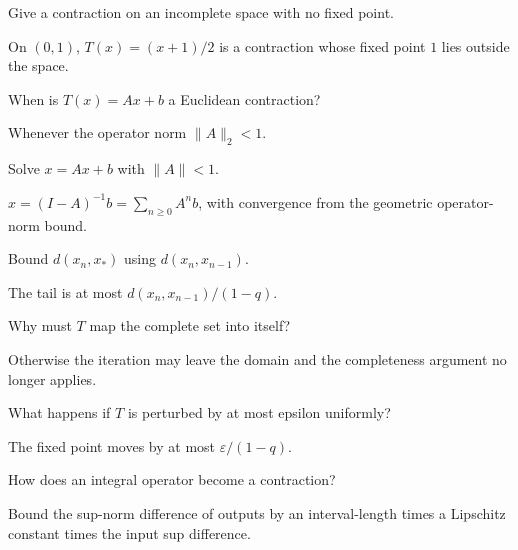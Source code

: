 \begin{problem}\label{prob:ii16-problem-04}
Give a contraction on an incomplete space with no fixed point.
\end{problem}
\begin{solution}
On $(0,1)$, $T(x)=(x+1)/2$ is a contraction whose fixed point $1$ lies outside the space.
\end{solution}

\begin{problem}\label{prob:ii16-problem-05}
When is $T(x)=Ax+b$ a Euclidean contraction?
\end{problem}
\begin{solution}
Whenever the operator norm $\|A\|_2<1$.
\end{solution}

\begin{problem}\label{prob:ii16-problem-06}
Solve $x=Ax+b$ with $\|A\|<1$.
\end{problem}
\begin{solution}
$x=(I-A)^{-1}b=\sum_{n\ge0}A^n b$, with convergence from the geometric operator-norm bound.
\end{solution}

\begin{problem}\label{prob:ii16-problem-07}
Bound $d(x_n,x_*)$ using $d(x_n,x_{n-1})$.
\end{problem}
\begin{solution}
The tail is at most $d(x_n,x_{n-1})/(1-q)$.
\end{solution}

\begin{problem}\label{prob:ii16-problem-08}
Why must $T$ map the complete set into itself?
\end{problem}
\begin{solution}
Otherwise the iteration may leave the domain and the completeness argument no longer applies.
\end{solution}

\begin{problem}\label{prob:ii16-problem-09}
What happens if $T$ is perturbed by at most epsilon uniformly?
\end{problem}
\begin{solution}
The fixed point moves by at most $\varepsilon/(1-q)$.
\end{solution}

\begin{problem}\label{prob:ii16-problem-10}
How does an integral operator become a contraction?
\end{problem}
\begin{solution}
Bound the sup-norm difference of outputs by an interval-length times a Lipschitz constant times the input sup difference.
\end{solution}

